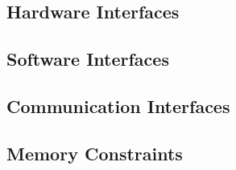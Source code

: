 \documentclass{scrreprt}
\begin{document}
\subsection{Hardware Interfaces}

 


\subsection{Software Interfaces}

\subsection{Communication Interfaces}

\subsection{Memory Constraints}

\end{document}
